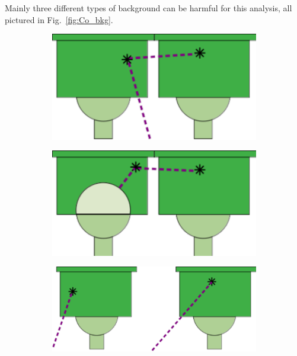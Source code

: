 Mainly three different types of background can be harmful for this analysis, all pictured in Fig.~\ref{fig:Co_bkg}.
\begin{figure}[h]
  \centering
  \begin{subfigure}[t]{0.30\textwidth}
    \centering
    \includegraphics[height=0.50\textwidth]{commissioning/fig_commissioning/Co_bkg_1.pdf}
    \captionsetup{justification=justified}
    \caption{
      \label{subfig:Co_bkg_1}}
  \end{subfigure}
  \hfill
  \begin{subfigure}[t]{0.30\textwidth}
    \centering
    \includegraphics[height=0.50\textwidth]{commissioning/fig_commissioning/Co_bkg_2.pdf}
    \captionsetup{justification=justified}
    \caption{
      \label{subfig:Co_bkg_2}}
  \end{subfigure}
  \hfill
  \begin{subfigure}[t]{0.30\textwidth}
    \centering
    \includegraphics[height=0.50\textwidth]{commissioning/fig_commissioning/Co_bkg_3.pdf}

\end{subfigure}
\end{figure}
